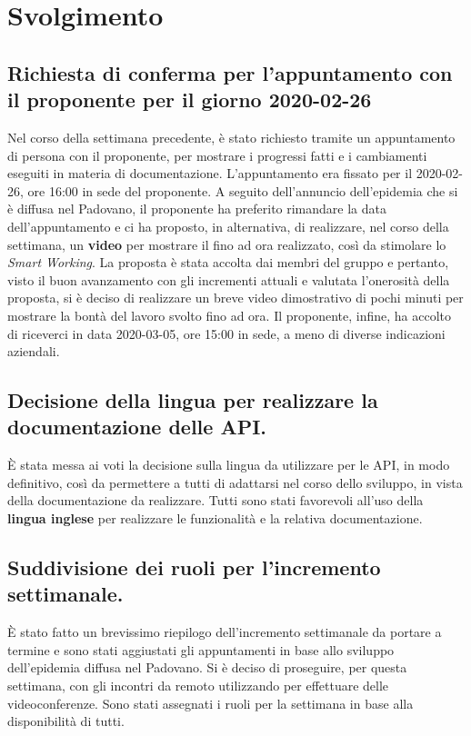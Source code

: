 \newpage
\section*{Svolgimento}

	\subsection*{Richiesta di conferma per l'appuntamento con il proponente per il giorno 2020-02-26}
		Nel corso della settimana precedente, è stato richiesto tramite  un appuntamento di persona con il proponente, per mostrare i progressi fatti e i cambiamenti eseguiti in materia di documentazione.
		\newline
		L'appuntamento era fissato per il 2020-02-26, ore 16:00 in sede del proponente. A seguito dell'annuncio dell'epidemia che si è diffusa nel Padovano, il proponente ha preferito rimandare la data dell'appuntamento e ci ha proposto, in alternativa, di realizzare, nel corso della settimana, un \textbf{video} per mostrare il  fino ad ora realizzato, così da stimolare lo \textit{Smart Working}.
		\newline
		La proposta è stata accolta dai membri del gruppo e pertanto, visto il buon avanzamento con gli incrementi attuali e valutata l'onerosità della proposta, si è deciso di realizzare un breve video dimostrativo di pochi minuti per mostrare la bontà del lavoro svolto fino ad ora.
		\newline
		Il proponente, infine, ha accolto di riceverci in data 2020-03-05, ore 15:00 in sede, a meno di diverse indicazioni aziendali.

	\subsection*{Decisione della lingua per realizzare la documentazione delle API.}
		È stata messa ai voti la decisione sulla lingua da utilizzare per le API, in modo definitivo, così da permettere a tutti di adattarsi nel corso dello sviluppo, in vista della documentazione da realizzare.
		\newline
		Tutti sono stati favorevoli all'uso della \textbf{lingua inglese} per realizzare le funzionalità e la relativa documentazione.

	\subsection*{Suddivisione dei ruoli per l'incremento settimanale.}
		È stato fatto un brevissimo riepilogo dell'incremento settimanale da portare a termine e sono stati aggiustati gli appuntamenti in base allo sviluppo dell'epidemia diffusa nel Padovano.
		\newline
		Si è deciso di proseguire, per questa settimana, con gli incontri da remoto utilizzando  per effettuare delle videoconferenze. Sono stati assegnati i ruoli per la settimana in base alla disponibilità di tutti.

